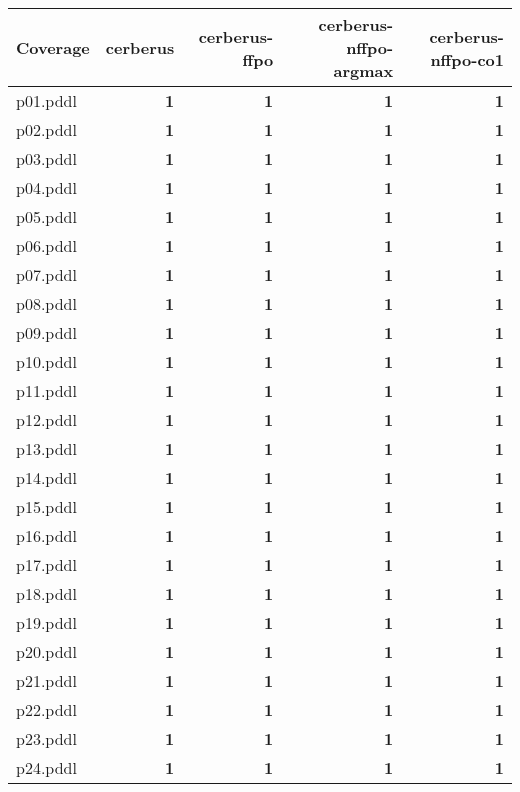 \documentclass{article}
\begin{document}
\begin{tabular}{@{}lrrrr@{}}
Coverage & cerberus & cerberus-ffpo & cerberus-nffpo-argmax & cerberus-nffpo-co1 \\
\midrule
p01.pddl & \textbf{1} & \textbf{1} & \textbf{1} & \textbf{1} \\
p02.pddl & \textbf{1} & \textbf{1} & \textbf{1} & \textbf{1} \\
p03.pddl & \textbf{1} & \textbf{1} & \textbf{1} & \textbf{1} \\
p04.pddl & \textbf{1} & \textbf{1} & \textbf{1} & \textbf{1} \\
p05.pddl & \textbf{1} & \textbf{1} & \textbf{1} & \textbf{1} \\
p06.pddl & \textbf{1} & \textbf{1} & \textbf{1} & \textbf{1} \\
p07.pddl & \textbf{1} & \textbf{1} & \textbf{1} & \textbf{1} \\
p08.pddl & \textbf{1} & \textbf{1} & \textbf{1} & \textbf{1} \\
p09.pddl & \textbf{1} & \textbf{1} & \textbf{1} & \textbf{1} \\
p10.pddl & \textbf{1} & \textbf{1} & \textbf{1} & \textbf{1} \\
p11.pddl & \textbf{1} & \textbf{1} & \textbf{1} & \textbf{1} \\
p12.pddl & \textbf{1} & \textbf{1} & \textbf{1} & \textbf{1} \\
p13.pddl & \textbf{1} & \textbf{1} & \textbf{1} & \textbf{1} \\
p14.pddl & \textbf{1} & \textbf{1} & \textbf{1} & \textbf{1} \\
p15.pddl & \textbf{1} & \textbf{1} & \textbf{1} & \textbf{1} \\
p16.pddl & \textbf{1} & \textbf{1} & \textbf{1} & \textbf{1} \\
p17.pddl & \textbf{1} & \textbf{1} & \textbf{1} & \textbf{1} \\
p18.pddl & \textbf{1} & \textbf{1} & \textbf{1} & \textbf{1} \\
p19.pddl & \textbf{1} & \textbf{1} & \textbf{1} & \textbf{1} \\
p20.pddl & \textbf{1} & \textbf{1} & \textbf{1} & \textbf{1} \\
p21.pddl & \textbf{1} & \textbf{1} & \textbf{1} & \textbf{1} \\
p22.pddl & \textbf{1} & \textbf{1} & \textbf{1} & \textbf{1} \\
p23.pddl & \textbf{1} & \textbf{1} & \textbf{1} & \textbf{1} \\
p24.pddl & \textbf{1} & \textbf{1} & \textbf{1} & \textbf{1} \\

\end{tabular}
\end{document}
